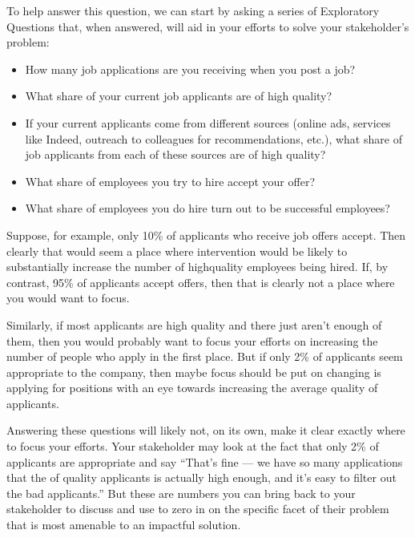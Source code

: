 \documentclass[letterpaper,10pt,english]{jupyterBook}
\begin{document}
\sphinxAtStartPar
To help answer this question, we can start by asking a series of Exploratory Questions that, when answered, will aid in your efforts to solve your stakeholder’s problem:
\begin{itemize}
\item {} 
\sphinxAtStartPar
How many job applications are you receiving when you post a job?

\item {} 
\sphinxAtStartPar
What share of your current job applicants are of high quality?

\item {} 
\sphinxAtStartPar
If your current applicants come from different sources (online ads, services like Indeed, outreach to colleagues for recommendations, etc.), what share of job applicants from each of these sources are of high quality?

\item {} 
\sphinxAtStartPar
What share of employees you try to hire accept your offer?

\item {} 
\sphinxAtStartPar
What share of employees you do hire turn out to be successful employees?

\end{itemize}

\sphinxAtStartPar
Suppose, for example, only 10\% of applicants who receive job offers accept. Then clearly that would seem a place where intervention would be likely to substantially increase the number of high\sphinxhyphen{}quality employees being hired. If, by contrast, 95\% of applicants accept offers, then that is clearly not a place where you would want to focus.

\sphinxAtStartPar
Similarly, if most applicants are high quality and there just aren’t enough of them, then you would probably want to focus your efforts on increasing the number of people who apply in the first place. But if only 2\% of applicants seem appropriate to the company, then maybe focus should be put on changing  is applying for positions with an eye towards increasing the average quality of applicants.

\sphinxAtStartPar
Answering these questions will likely not, on its own, make it clear exactly where to focus your efforts. Your stakeholder may look at the fact that only 2\% of applicants are appropriate and say “That’s fine — we have so many applications that the  of quality applicants is actually high enough, and it’s easy to filter out the bad applicants.” But these are numbers you can bring back to your stakeholder to discuss and use to zero in on the specific facet of their problem that is most amenable to an impactful solution.
\end{document}
